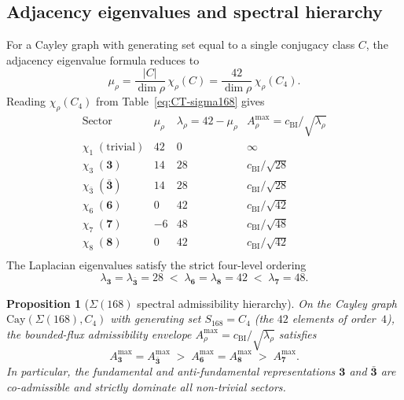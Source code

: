 \documentclass[11pt,a4paper]{article}
\newtheorem{proposition}{Proposition}
\begin{document}
  \subsection{Adjacency eigenvalues and spectral hierarchy}
    \label{sec:sigma168-spectrum}

    For a Cayley graph with generating set equal to a single conjugacy class $C$, the
    adjacency eigenvalue formula reduces to
    \begin{equation}
      \mu_\rho
      = \frac{|C|}{\dim\rho}\,\chi_\rho(C)
      = \frac{42}{\dim\rho}\,\chi_\rho(C_4).
      \label{eq:mu-sigma168}
    \end{equation}
    Reading $\chi_\rho(C_4)$ from Table~\eqref{eq:CT-sigma168} gives
    \begin{equation}
      \renewcommand{\arraystretch}{1.4}
      \begin{array}{l|ccc}
        \text{Sector} &
        \mu_\rho &
        \lambda_\rho = 42 - \mu_\rho &
        A^{\max}_\rho = c_{\mathrm{BI}}/\sqrt{\lambda_\rho} \\
        \hline
        \chi_1\;(\text{trivial}) & 42 & 0  & \infty \\
        \chi_3\;(\mathbf{3}) & 14 & 28 & c_{\mathrm{BI}}/\sqrt{28} \\
        \chi_{\bar 3}\;(\bar{\mathbf{3}}) & 14 & 28 & c_{\mathrm{BI}}/\sqrt{28} \\
        \chi_6\;(\mathbf{6}) & 0  & 42 & c_{\mathrm{BI}}/\sqrt{42} \\
        \chi_7\;(\mathbf{7}) & -6 & 48 & c_{\mathrm{BI}}/\sqrt{48} \\
        \chi_8\;(\mathbf{8}) & 0  & 42 & c_{\mathrm{BI}}/\sqrt{42} \\
      \end{array}
      \label{eq:sigma168-spectrum-table}
    \end{equation}
    The Laplacian eigenvalues satisfy the strict four-level ordering
    \begin{equation}
      \lambda_{\mathbf{3}} = \lambda_{\bar{\mathbf{3}}} = 28
      \;<\;
      \lambda_{\mathbf{6}} = \lambda_{\mathbf{8}} = 42
      \;<\;
      \lambda_{\mathbf{7}} = 48.
      \label{eq:sigma168-ordering}
    \end{equation}

    \begin{proposition}[$\Sigma(168)$ spectral admissibility hierarchy]
      \label{prop:sigma168-hierarchy}
      On the Cayley graph $\mathrm{Cay}(\Sigma(168), C_4)$ with generating set
      $S_{168} = C_4$ (the $42$ elements of order~$4$), the bounded-flux admissibility
      envelope $A^{\max}_\rho = c_{\mathrm{BI}}/\sqrt{\lambda_\rho}$ satisfies
      \begin{equation}
        A^{\max}_{\mathbf{3}} = A^{\max}_{\bar{\mathbf{3}}}
        \;>\;
        A^{\max}_{\mathbf{6}} = A^{\max}_{\mathbf{8}}
        \;>\;
        A^{\max}_{\mathbf{7}}.
        \label{eq:sigma168-admissibility}
      \end{equation}
      In particular, the fundamental and anti-fundamental representations $\mathbf{3}$ and
      $\bar{\mathbf{3}}$ are co-admissible and strictly dominate all non-trivial sectors.
    \end{proposition}
\end{document}
